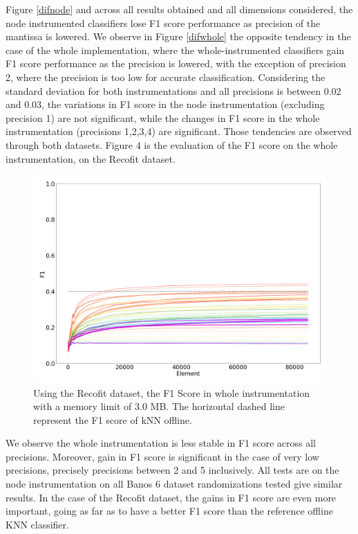\documentclass[conference]{IEEEtran}
\begin{document}
Figure \ref{difnode} and across all results obtained and all dimensions considered, the node instrumented classifiers lose F1 score performance as precision of the mantissa is lowered. We observe in Figure \ref{difwhole} the opposite tendency in the case of the whole implementation, where the whole-instrumented classifiers gain F1 score performance as the precision is lowered, with the exception of precision 2, where the precision is too low for accurate classification. Considering the standard deviation for both instrumentations and all precisions is between 0.02 and 0.03, the variations in F1 score in the node instrumentation (excluding precision 1) are not significant, while the changes in F1 score in the whole instrumentation (precisions 1,2,3,4) are significant. Those tendencies are observed through both datasets. 
Figure 4 is the evaluation of the F1 score on the whole instrumentation, on the Recofit dataset.
\begin{figure}[htbp]
\centerline{\includegraphics[width=\linewidth]{recofit_5_11.png}}
\caption{Using the Recofit dataset, the F1 Score in whole instrumentation with a memory limit of 3.0 MB. The horizontal dashed line represent the F1 score of kNN offline.}
\label{recofit}
\end{figure}
We observe the whole instrumentation is less stable in F1 score across all precisions. Moreover, gain in F1 score is significant in the case of very low precisions, precisely precisions between 2 and 5 inclusively. All tests are on the node instrumentation on all Banos 6 dataset randomizations tested give similar results.
In the case of the Recofit dataset, the gains in F1 score are even more important, going as far as to have a better F1 score than the reference offline KNN classifier.
\end{document}
